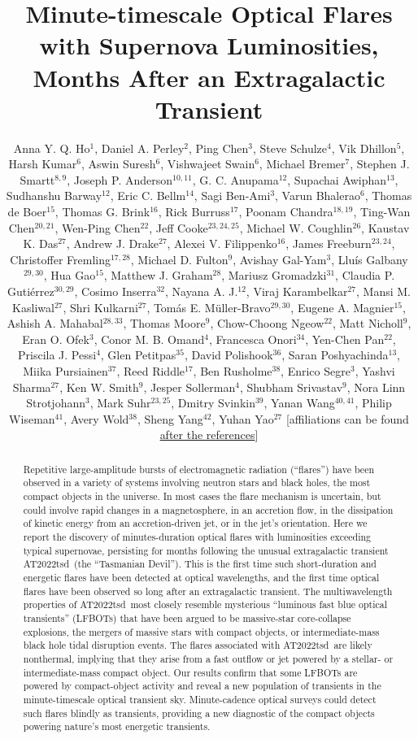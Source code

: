 \documentclass{nature_plusfigure}
\title{Minute-timescale Optical Flares with Supernova Luminosities, Months After an Extragalactic Transient}
\author{Anna Y. Q. Ho$^{1}$, Daniel A. Perley$^{2}$, Ping Chen$^{3}$, Steve Schulze$^{4}$, Vik Dhillon$^{5}$, Harsh Kumar$^{6}$, Aswin Suresh$^{6}$, Vishwajeet Swain$^{6}$, Michael Bremer$^{7}$, Stephen J. Smartt$^{8,9}$, Joseph P. Anderson$^{10,11}$, G. C. Anupama$^{12}$, Supachai Awiphan$^{13}$, Sudhanshu Barway$^{12}$, Eric C. Bellm$^{14}$, Sagi Ben-Ami$^{3}$, Varun Bhalerao$^{6}$, Thomas de Boer$^{15}$, Thomas G. Brink$^{16}$, Rick Burruss$^{17}$, Poonam Chandra$^{18,19}$, Ting-Wan Chen$^{20,21}$, Wen-Ping Chen$^{22}$, Jeff Cooke$^{23,24,25}$, Michael W. Coughlin$^{26}$, Kaustav K. Das$^{27}$, Andrew J. Drake$^{27}$, Alexei V. Filippenko$^{16}$, James Freeburn$^{23,24}$, Christoffer Fremling$^{17,28}$, Michael D. Fulton$^{9}$, Avishay Gal-Yam$^{3}$, Llu\'is Galbany$^{29,30}$, Hua Gao$^{15}$, Matthew J. Graham$^{28}$, Mariusz Gromadzki$^{31}$, Claudia P. Guti\'errez$^{30,29}$, Cosimo Inserra$^{32}$, Nayana A. J.$^{12}$, Viraj Karambelkar$^{27}$, Mansi M. Kasliwal$^{27}$, Shri Kulkarni$^{27}$, Tom\'as E. M\"uller-Bravo$^{29,30}$, Eugene A. Magnier$^{15}$, Ashish A. Mahabal$^{28,33}$, Thomas Moore$^{9}$, Chow-Choong Ngeow$^{22}$, Matt Nicholl$^{9}$, Eran O. Ofek$^{3}$, Conor M. B. Omand$^{4}$, Francesca Onori$^{34}$, Yen-Chen Pan$^{22}$, Priscila J. Pessi$^{4}$, Glen Petitpas$^{35}$, David Polishook$^{36}$, Saran Poshyachinda$^{13}$, Miika Pursiainen$^{37}$, Reed Riddle$^{17}$, Ben Rusholme$^{38}$, Enrico Segre$^{3}$, Yashvi Sharma$^{27}$, Ken W. Smith$^{9}$, Jesper Sollerman$^{4}$, Shubham Srivastav$^{9}$, Nora Linn Strotjohann$^{3}$, Mark Suhr$^{23,25}$, Dmitry Svinkin$^{39}$, Yanan Wang$^{40,41}$, Philip Wiseman$^{41}$, Avery Wold$^{38}$, Sheng Yang$^{42}$, Yuhan Yao$^{27}$
[affiliations can be found \hyperref[sec:affiliations]{after the references}]
	}
\newcommand{\at}{AT2022tsd}
\begin{document}
\maketitle

\begin{abstract}

Repetitive large-amplitude bursts of electromagnetic radiation (``flares'') have been observed in a variety of systems involving neutron stars and black holes\cite{Fender1997,Hurley1999,Marrone2008,Racusin2008,Kasliwal2008,CastroTirado2008,Stefanescu2008,Nesci2021}, the most compact objects in the universe. In most cases the flare mechanism is uncertain, but could involve rapid changes in a magnetosphere\cite{Hurley1999,CastroTirado2008,Stefanescu2008}, in an accretion flow\cite{Fender2004,Yuan2014}, in the dissipation of kinetic energy from an accretion-driven jet\cite{Racusin2008}, or in the jet's orientation\cite{Raiteri2017}.
Here we report the discovery of minutes-duration optical flares with luminosities exceeding typical supernovae, persisting for months following the unusual extragalactic transient \at\ (the ``Tasmanian Devil'').
This is the first time such short-duration and energetic flares have been detected at optical wavelengths, and the first time optical flares have been observed so long after an extragalactic transient.
The multiwavelength properties of \at\ most closely resemble mysterious ``luminous fast blue optical transients'' (LFBOTs\cite{Prentice2018,RiveraSandoval2018,Perley2019,Margutti2019,Ho2019,Coppejans2020,Ho2020_Koala,Perley2021,Bright2022,Ho2022_AT2020xnd,Yao2022}) that have been argued to be massive-star core-collapse explosions\cite{Prentice2018,Margutti2019,Perley2019}, the mergers of massive stars with compact objects\cite{Metzger2022}, or intermediate-mass black hole tidal disruption events\cite{Kuin2019,Perley2019}. The flares associated with \at\ are likely nonthermal, implying that they arise from a fast outflow or jet powered by a stellar- or intermediate-mass compact object.
Our results confirm that some LFBOTs are powered by compact-object activity
and reveal a new population of transients in the minute-timescale optical transient sky.
Minute-cadence optical surveys\cite{Ofek2023,Law2022} could detect such flares blindly as transients,
providing a new diagnostic of the compact objects powering nature's most energetic transients.

\end{abstract}
\end{document}
